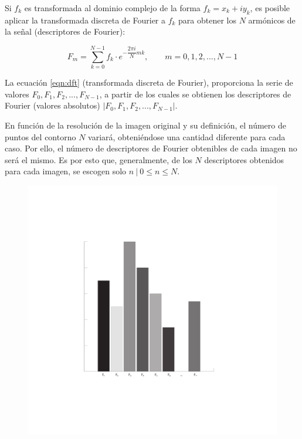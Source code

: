 Si $f_{k}$ es transformada al dominio complejo de la forma $f_{k} = x_{k} + iy_{k}$, es posible aplicar la transformada discreta de Fourier a $f_{k}$ para obtener los $N$ armónicos de la señal (descriptores de Fourier): 

\begin{equation}
	F_{m} = \sum_{k=0}^{N-1} f_{k}\cdot e^{-\dfrac{2\pi i}{N}mk},\qquad m = 0, 1, 2, ..., N-1
	\label{eqn:dft}
\end{equation}

La ecuación \ref{eqn:dft} (transformada discreta de Fourier), proporciona la serie de valores $ F_{0}, F_{1}, F_{2}, ..., F_{N-1} $, a partir de los cuales se obtienen los descriptores de Fourier (valores absolutos) $\lvert F_{0}, F_{1}, F_{2}, ..., F_{N-1} \rvert$.

En función de la resolución de la imagen original y su definición, el número de puntos del contorno $N$ variará, obteniéndose una cantidad diferente para cada caso. Por ello, el número de descriptores de Fourier obtenibles de cada imagen no será el mismo. Es por esto que, generalmente, de los $N$ descriptores obtenidos para cada imagen, se escogen solo $n\:|\:0\leq n\leq N$.

\begin{figure}[H]
	\centering
	\captionsetup{justification=centering}
	\includegraphics[width=\textwidth]{imagenes/marco_teorico/Descriptores_Fourier/Histograma_ejemplo_generico.pdf}
	\caption{}	
	\label{fig:fourier_histograma_generico_ejemplo}
\end{figure}

